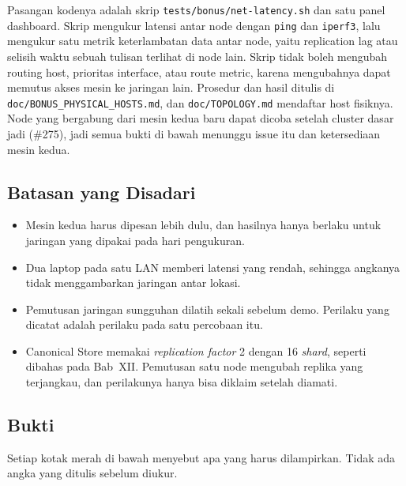Pasangan kodenya adalah skrip \texttt{tests/bonus/net-latency.sh} dan satu panel dashboard. Skrip mengukur latensi antar node dengan \texttt{ping} dan \texttt{iperf3}, lalu mengukur satu metrik keterlambatan data antar node, yaitu replication lag atau selisih waktu sebuah tulisan terlihat di node lain. Skrip tidak boleh mengubah routing host, prioritas interface, atau route metric, karena mengubahnya dapat memutus akses mesin ke jaringan lain. Prosedur dan hasil ditulis di \texttt{doc/BONUS\_PHYSICAL\_HOSTS.md}, dan \texttt{doc/TOPOLOGY.md} mendaftar host fisiknya. Node yang bergabung dari mesin kedua baru dapat dicoba setelah cluster dasar jadi (\#275), jadi semua bukti di bawah menunggu issue itu dan ketersediaan mesin kedua.

\subsection{Batasan yang Disadari}

\begin{itemize}
\tightlist
\item
  Mesin kedua harus dipesan lebih dulu, dan hasilnya hanya berlaku untuk jaringan yang dipakai pada hari pengukuran.
\item
  Dua laptop pada satu LAN memberi latensi yang rendah, sehingga angkanya tidak menggambarkan jaringan antar lokasi.
\item
  Pemutusan jaringan sungguhan dilatih sekali sebelum demo. Perilaku yang dicatat adalah perilaku pada satu percobaan itu.
\item
  Canonical Store memakai \textit{replication factor} 2 dengan 16 \textit{shard}, seperti dibahas pada Bab~XII. Pemutusan satu node mengubah replika yang terjangkau, dan perilakunya hanya bisa diklaim setelah diamati.
\end{itemize}

\subsection{Bukti}

Setiap kotak merah di bawah menyebut apa yang harus dilampirkan. Tidak ada angka yang ditulis sebelum diukur.


